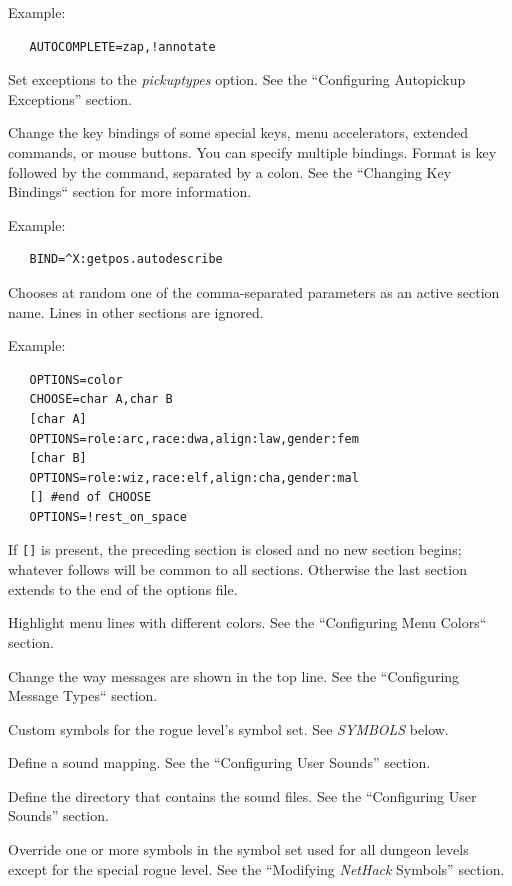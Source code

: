 \documentclass[titlepage]{article}
\begin{document}
\begin{description}
Example:
\begin{verbatim}
   AUTOCOMPLETE=zap,!annotate
\end{verbatim}

\item[AUTOPICKUP\textunderscore EXCEPTION]
Set exceptions to the {\textit{pickup\textunderscore types}}
option. See the ``Configuring Autopickup Exceptions'' section.
\item[BINDINGS]
Change the key bindings of some special keys, menu accelerators,
extended commands, or mouse buttons. You can specify multiple bindings.
Format is key followed by the command, separated by a colon.
See the ``Changing Key Bindings`` section for more information.

Example:
\begin{verbatim}
   BIND=^X:getpos.autodescribe
\end{verbatim}

\item[CHOOSE]
Chooses at random one of the comma-separated parameters as an active
section name.
Lines in other sections are ignored.

Example:
\begin{verbatim}
   OPTIONS=color
   CHOOSE=char A,char B
   [char A]
   OPTIONS=role:arc,race:dwa,align:law,gender:fem
   [char B]
   OPTIONS=role:wiz,race:elf,align:cha,gender:mal
   [] #end of CHOOSE
   OPTIONS=!rest_on_space
\end{verbatim}

If \texttt{[]} is present, the preceding section is closed and no new
section begins; whatever follows will be common to all sections.
Otherwise the last section extends to the end of the options file.

\item[MENUCOLOR]
Highlight menu lines with different colors.
See the ``Configuring Menu Colors`` section.
\item[MSGTYPE]
Change the way messages are shown in the top line.
See the ``Configuring Message Types`` section.
\item[ROGUESYMBOLS]
Custom symbols for the rogue level's symbol set.
See \textit{SYMBOLS} below.
\item[SOUND]
Define a sound mapping.
See the ``Configuring User Sounds'' section.
\item[SOUNDDIR]
Define the directory that contains the sound files.
See the ``Configuring User Sounds'' section.
\item[SYMBOLS]
Override one or more symbols in the symbol set used for all dungeon
levels except for the special rogue level.
See the ``Modifying \textit{NetHack} Symbols'' section.


\end{description}
\end{document}
